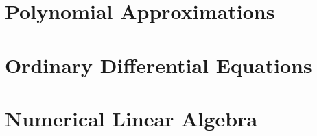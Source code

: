 \documentclass[british,11pt,a4paper]{report}
\begin{document}
\maketitle
\tableofcontents

\chapter{Polynomial Approximations}

\chapter{Ordinary Differential Equations}

\chapter{Numerical Linear Algebra}
%
\end{document}
